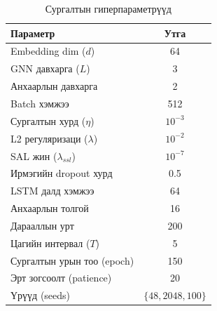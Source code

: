 \begin{table}[h]
\centering
\caption{Сургалтын гиперпараметрүүд}
\label{tab:hyperparams}
\begin{tabular}{lc}
\toprule
\textbf{Параметр} & \textbf{Утга} \\
\midrule
Embedding dim ($d$) & 64 \\
GNN давхарга ($L$) & 3 \\
Анхаарлын давхарга & 2 \\
Batch хэмжээ & 512 \\
Сургалтын хурд ($\eta$) & $10^{-3}$ \\
L2 регуляризаци ($\lambda$) & $10^{-2}$ \\
SAL жин ($\lambda_{ssl}$) & $10^{-7}$ \\
Ирмэгийн dropout хурд & 0.5 \\
LSTM далд хэмжээ & 64 \\
Анхаарлын толгой & 16 \\
Дарааллын урт & 200 \\
Цагийн интервал ($T$) & 5 \\
Сургалтын урын тоо (epoch) & 150 \\
Эрт зогсоолт (patience) & 20 \\
Үрүүд (seeds) & $\{48, 2048, 100\}$ \\
\bottomrule
\end{tabular}
\end{table}